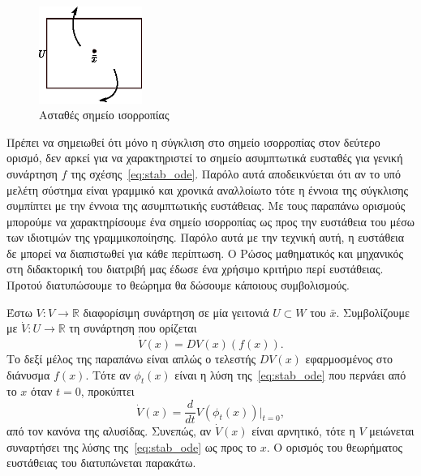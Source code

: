 \begin{figure}[h!]
    \centering
    \includegraphics[width=0.3\textwidth]{figures/stab_unstable.eps}
    \caption{Ασταθές σημείο ισορροπίας}
    \label{fig:stab_unstable}
\end{figure}

Πρέπει να σημειωθεί ότι μόνο η σύγκλιση στο σημείο ισορροπίας στον δεύτερο
ορισμό, δεν αρκεί για να χαρακτηριστεί το σημείο ασυμπτωτικά ευσταθές για
γενική συνάρτηση \( f \) της σχέσης~\eqref{eq:stab_ode}. Παρόλο αυτά
αποδεικνύεται ότι αν το υπό μελέτη σύστημα είναι γραμμικό και χρονικά αναλλοίωτο
τότε η έννοια της σύγκλισης συμπίπτει με την έννοια της ασυμπτωτικής ευστάθειας.
Με τους παραπάνω ορισμούς μπορούμε να χαρακτηρίσουμε ένα σημείο ισορροπίας ως
προς την ευστάθεια του μέσω των ιδιοτιμών της γραμμικοποίησης. Παρόλο αυτά με
την τεχνική αυτή, η ευστάθεια δε μπορεί να διαπιστωθεί για κάθε περίπτωση. Ο
Ρώσος μαθηματικός και μηχανικός  στη διδακτορική του διατριβή μας
έδωσε ένα χρήσιμο κριτήριο περί ευστάθειας. Προτού διατυπώσουμε το θεώρημα θα
δώσουμε κάποιους συμβολισμούς.

Έστω \( V: V \to \mathbb{R} \) διαφορίσιμη συνάρτηση σε μία γειτονιά \( U
\subset W \) του \( \bar{x} \). Συμβολίζουμε με \( \dot{V}: U \to \mathbb{R} \)
τη συνάρτηση που ορίζεται
\[
    \dot{V}(x) = DV(x)(f(x)).
\]
Το δεξί μέλος της παραπάνω είναι απλώς ο τελεστής \( DV(x) \) εφαρμοσμένος στο
διάνυσμα \( f(x) \). Τότε αν \( \phi_t(x) \) είναι η λύση
της~\eqref{eq:stab_ode} που περνάει από το \( x \) όταν \( t = 0 \), προκύπτει
\[
    \dot{V}(x) = \frac{d}{dt}V(\phi_t(x))\big\rvert_{t = 0},
\]
από τον κανόνα της αλυσίδας. Συνεπώς, αν \( \dot{V}(x) \) είναι αρνητικό, τότε η
\( V \) μειώνεται συναρτήσει της λύσης της~\eqref{eq:stab_ode} ως προς το \( x
\). Ο ορισμός του θεωρήματος ευστάθειας του  διατυπώνεται
παρακάτω.


